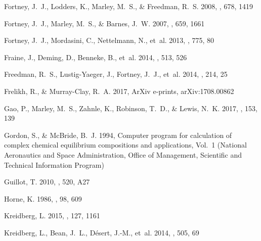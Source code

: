 \documentclass[twocolumn, trackchanges]{aastex61}
\begin{document}
\begin{thebibliography}{}
{Fortney}, J.~J., {Lodders}, K., {Marley}, M.~S., \& {Freedman}, R.~S. 2008,
  \apj, 678, 1419

{Fortney}, J.~J., {Marley}, M.~S., \& {Barnes}, J.~W. 2007, \apj, 659, 1661

{Fortney}, J.~J., {Mordasini}, C., {Nettelmann}, N., {et~al.} 2013, \apj, 775,
  80

{Fraine}, J., {Deming}, D., {Benneke}, B., {et~al.} 2014, \nat, 513, 526

{Freedman}, R.~S., {Lustig-Yaeger}, J., {Fortney}, J.~J., {et~al.} 2014, \apjs,
  214, 25

{Frelikh}, R., \& {Murray-Clay}, R.~A. 2017, ArXiv e-prints, arXiv:1708.00862

{Gao}, P., {Marley}, M.~S., {Zahnle}, K., {Robinson}, T.~D., \& {Lewis}, N.~K.
  2017, \aj, 153, 139

Gordon, S., \& McBride, B.~J. 1994, Computer program for calculation of complex
  chemical equilibrium compositions and applications, Vol.~1 (National
  Aeronautics and Space Administration, Office of Management, Scientific and
  Technical Information Program)

{Guillot}, T. 2010, \aap, 520, A27

{Horne}, K. 1986, \pasp, 98, 609

{Kreidberg}, L. 2015, \pasp, 127, 1161

{Kreidberg}, L., {Bean}, J.~L., {D{\'e}sert}, J.-M., {et~al.}
  2014{}, \nat, 505, 69


\end{thebibliography}
\end{document}
